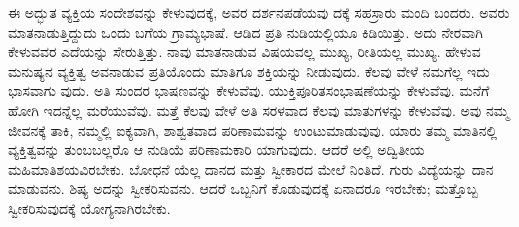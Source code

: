 ಈ ಅದ್ಭುತ ವ್ಯಕ್ತಿಯ ಸಂದೇಶವನ್ನು ಕೇಳುವುದಕ್ಕೆ, ಅವರ ದರ್ಶನಪಡೆಯವು ದಕ್ಕೆ ಸಹಸ್ರಾರು ಮಂದಿ ಬಂದರು. ಅವರು ಮಾತನಾಡುತ್ತಿದ್ದುದು ಒಂದು ಬಗೆಯ ಗ್ರಾಮ್ಯಭಾಷೆ. ಆಡಿದ ಪ್ರತಿ ನುಡಿಯಲ್ಲಿಯೂ ಕಿಡಿಯಿತ್ತು. ಅದು ನೇರವಾಗಿ ಕೇಳುವವರ ಎದೆಯನ್ನು ಸೇರುತ್ತಿತ್ತು. ನಾವು ಮಾತನಾಡುವ ವಿಷಯವಲ್ಲ ಮುಖ್ಯ, ರೀತಿಯಲ್ಲ ಮುಖ್ಯ. ಹೇಳುವ ಮನುಷ್ಯನ ವ್ಯಕ್ತಿತ್ವ ಅವನಾಡುವ ಪ್ರತಿಯೊಂದು ಮಾತಿಗೂ ಶಕ್ತಿಯನ್ನು ನೀಡುವುದು. ಕೆಲವು ವೇಳೆ ನಮಗೆಲ್ಲ ಇದು ಭಾಸವಾಗು ವುದು. ಅತಿ ಸುಂದರ ಭಾಷಣವನ್ನು ಕೇಳುವೆವು. ಯುಕ್ತಿಪೂರಿತಸಂಭಾಷಣೆಯನ್ನು ಕೇಳುವೆವು. ಮನೆಗೆ ಹೋಗಿ ಇದನ್ನೆಲ್ಲ ಮರೆಯುವೆವು. ಮತ್ತೆ ಕೆಲವು ವೇಳೆ ಅತಿ ಸರಳವಾದ ಕೆಲವು ಮಾತುಗಳನ್ನು ಕೇಳುವೆವು. ಅವು ನಮ್ಮ ಜೀವನಕ್ಕೆ ತಾಕಿ, ನಮ್ಮಲ್ಲಿ ಐಕ್ಯವಾಗಿ, ಶಾಶ್ವತವಾದ ಪರಿಣಾಮವನ್ನು ಉಂಟುಮಾಡುವುವು. ಯಾರು ತಮ್ಮ ಮಾತಿನಲ್ಲಿ ವ್ಯಕ್ತಿತ್ವವನ್ನು ತುಂಬಬಲ್ಲರೊ ಆ ನುಡಿಯೆ ಪರಿಣಾಮಕಾರಿ ಯಾಗುವುದು. ಆದರೆ ಅಲ್ಲಿ ಅದ್ವಿತೀಯ ಮಹಿಮಾತಿಶಯವಿರಬೇಕು. ಬೋಧನೆ ಯೆಲ್ಲ ದಾನದ ಮತ್ತು ಸ್ವೀಕಾರದ ಮೇಲೆ ನಿಂತಿದೆ. ಗುರು ವಿದ್ಯೆಯನ್ನು ದಾನ ಮಾಡುವನು. ಶಿಷ್ಯ ಅದನ್ನು ಸ್ವೀಕರಿಸುವನು. ಆದರೆ ಒಬ್ಬನಿಗೆ ಕೊಡುವುದಕ್ಕೆ ಏನಾದರೂ ಇರಬೇಕು; ಮತ್ತೊಬ್ಬ ಸ್ವೀಕರಿಸುವುದಕ್ಕೆ ಯೋಗ್ಯನಾಗಿರಬೇಕು.

